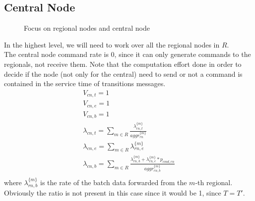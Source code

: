 \documentclass[11pt]{article}
\begin{document}
\subsection{Central Node}
\begin{figure}[H]
	\centering
	\hspace*{-3.7cm}
	\frame{}
	\caption{Focus on regional nodes and central node}
\end{figure}
In the highest level, we will need to work over all the regional nodes in $R$.\\
The central node command rate is 0, since it can only generate commands to the regionals, not receive them. Note that the computation effort done in order to decide if the node (not only for the central) need to send or not a command is contained in the service time of transitions messages. 
\begin{equation}
	\begin{array}{l}
		V_{cn, t} = 1 \\
		V_{cn, e} = 1 \\ %
		V_{cn, b} = 1 \\
        \lambda_{cn, t} = \sum\limits_{m \in R}{ \frac{\lambda^{\{m\}}_{rn, t}}{aggr^{\{ m \}}_{rn}}}  \\
        \lambda_{cn, e} = \sum\limits_{m \in R}{\lambda^{\{m\}}_{rn, e}} \\
		\lambda_{cn,b}=\sum\limits_{m \in R}\frac{\lambda_{rn,b}^{\{m\}}+\lambda_{rn,e}^{\{m\}}*p_{cmd,rn}}{aggr^{\{ m \}}_{rn,b}}\\
	\end{array}
\end{equation}
where $\lambda^{\{ m \}}_{rn, b}$ is the rate of the batch data forwarded from the $m$-th regional.
Obviously the ratio is not present in this case since it would be 1, since $T = T'$.\\
\end{document}
